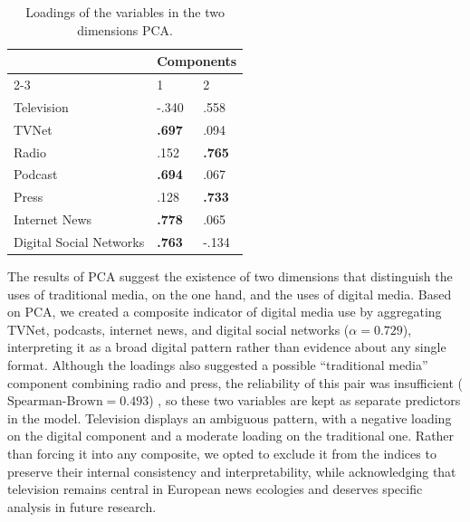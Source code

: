 \documentclass[english]{textolivre}
\begin{document}
\begin{table}[h!]
\centering
\begin{threeparttable}
\caption{Loadings of the variables in the two dimensions PCA.}\label{tab-1}
\begin{tabular}{p{5cm} p{2cm} p{2cm}}
\toprule
 & \multicolumn{2}{c}{Components} \\
\cmidrule(lr){2-3}
 & 1 & 2 \\
\midrule
Television & -.340 & .558 \\
TVNet & \textbf{.697} & .094 \\
Radio & .152 & \textbf{.765} \\
Podcast & \textbf{.694} & .067 \\
Press & .128 & \textbf{.733} \\
Internet News & \textbf{.778} & .065 \\
Digital Social Networks & \textbf{.763} & -.134 \\
\bottomrule
\end{tabular}
\end{threeparttable}
\end{table} 

The results of PCA suggest the existence of two dimensions that distinguish the uses of traditional media, on the one hand, and the uses of digital media. Based on PCA, we created a composite indicator of digital media use by aggregating TVNet, podcasts, internet news, and digital social networks ($\alpha = 0.729$), interpreting it as a broad digital pattern rather than evidence about any single format. Although the loadings also suggested a possible ``traditional media'' component combining radio and press, the reliability of this pair was insufficient ($\text{Spearman-Brown} = 0.493$) \cite{kline2011}, so these two variables are kept as separate predictors in the model. Television displays an ambiguous pattern, with a negative loading on the digital component and a moderate loading on the traditional one. Rather than forcing it into any composite, we opted to exclude it from the indices to preserve their internal consistency and interpretability, while acknowledging that television remains central in European news ecologies and deserves specific analysis in future research.
\end{document}
